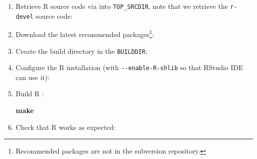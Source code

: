 \documentclass[
]{book}
\newenvironment{Shaded}{\begin{snugshade}}{\end{snugshade}}
\newcommand{\AttributeTok}[1]{\textcolor[rgb]{0.13,0.29,0.53}{#1}}
\newcommand{\BuiltInTok}[1]{#1}
\newcommand{\FunctionTok}[1]{\textcolor[rgb]{0.13,0.29,0.53}{\textbf{#1}}}
\newcommand{\NormalTok}[1]{#1}
\newcommand{\OperatorTok}[1]{\textcolor[rgb]{0.81,0.36,0.00}{\textbf{#1}}}
\newcommand{\StringTok}[1]{\textcolor[rgb]{0.31,0.60,0.02}{#1}}
\newcommand{\VariableTok}[1]{\textcolor[rgb]{0.00,0.00,0.00}{#1}}
\begin{document}
\begin{enumerate}
\def\labelenumi{\arabic{enumi}.}
\setcounter{enumi}{-1}
\item
  Retrieve R source code via into \texttt{TOP\_SRCDIR}, note that we retrieve the \texttt{r-devel} source code:

\begin{Shaded}
\end{Shaded}
\item
  Download the latest recommended packages\footnote{Recommended packages are not in the subversion repository.}:

\begin{Shaded}
\end{Shaded}
\item
  Create the build directory in the \texttt{BUILDDIR}:

\begin{Shaded}
\end{Shaded}
\item
  Configure the R installation (with \texttt{-\/-enable-R-shlib} so that RStudio IDE can use it):

\begin{Shaded}
\end{Shaded}
\item
  Build R :

\begin{Shaded}
\begin{Highlighting}[]
\FunctionTok{make}
\end{Highlighting}
\end{Shaded}
\item
  Check that R works as expected:


\end{enumerate}
\end{document}
